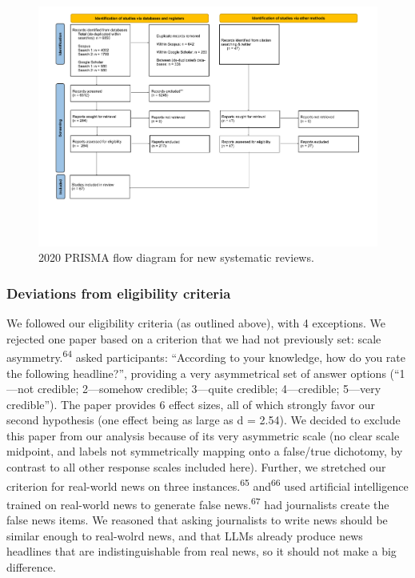 \documentclass[
  doc,floatsintext]{apa6}
\begin{document}
\begin{figure}
\centering
\includegraphics{literature_search/PRISMA_2020_flow_diagram.pdf}
\caption{\label{fig:prisma-flowchart}2020 PRISMA flow diagram for new systematic reviews.}
\end{figure}

\subsubsection{Deviations from eligibility criteria}\label{deviations-from-eligibility-criteria}

We followed our eligibility criteria (as outlined above), with 4 exceptions. We rejected one paper based on a criterion that we had not previously set: scale asymmetry.\textsuperscript{64} asked participants: ``According to your knowledge, how do you rate the following headline?'', providing a very asymmetrical set of answer options (``1---not credible; 2---somehow credible; 3---quite credible; 4---credible; 5---very credible''). The paper provides 6 effect sizes, all of which strongly favor our second hypothesis (one effect being as large as d = 2.54). We decided to exclude this paper from our analysis because of its very asymmetric scale (no clear scale midpoint, and labels not symmetrically mapping onto a false/true dichotomy, by contrast to all other response scales included here). Further, we stretched our criterion for real-world news on three instances.\textsuperscript{65} and\textsuperscript{66} used artificial intelligence trained on real-world news to generate false news.\textsuperscript{67} had journalists create the false news items. We reasoned that asking journalists to write news should be similar enough to real-wolrd news, and that LLMs already produce news headlines that are indistinguishable from real news, so it should not make a big difference.
\end{document}
